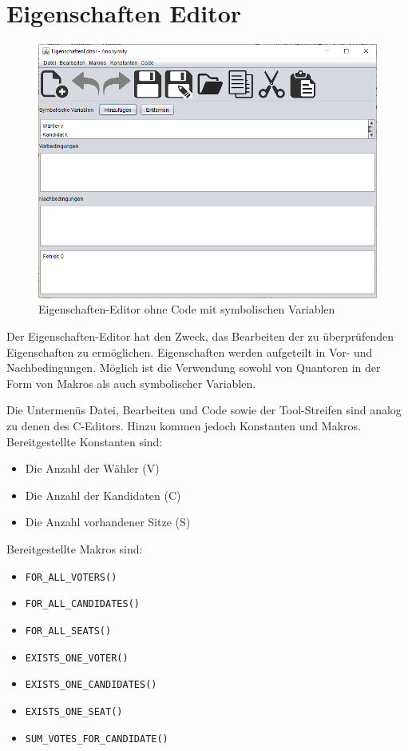 \documentclass[a4paper]{scrreprt}
\begin{document}
\section{Eigenschaften Editor}

\begin{figure}[H]
\includegraphics[scale=0.5]{raw-ohne-code.png}
\caption{Eigenschaften-Editor ohne Code mit symbolischen Variablen}
\label{Eigenschaften-Editor-ohne-code}
\end{figure}

Der Eigenschaften-Editor hat den Zweck, das Bearbeiten der zu überprüfenden Eigenschaften zu ermöglichen. Eigenschaften werden aufgeteilt in Vor- und Nachbedingungen. Möglich ist die Verwendung sowohl von Quantoren in der Form von Makros als auch symbolischer Variablen. 

Die Untermenüs Datei, Bearbeiten und Code sowie der Tool-Streifen sind analog zu denen des C-Editors. Hinzu kommen jedoch Konstanten und Makros. Bereitgestellte Konstanten sind: 

\begin{itemize}
\item Die Anzahl der Wähler (V)
\item Die Anzahl der Kandidaten (C)
\item Die Anzahl vorhandener Sitze (S)
\end{itemize}

Bereitgestellte Makros sind:

\begin{itemize}
\item \verb!FOR_ALL_VOTERS()!
\item \verb!FOR_ALL_CANDIDATES()!
\item \verb!FOR_ALL_SEATS()!
\item \verb!EXISTS_ONE_VOTER()!
\item \verb!EXISTS_ONE_CANDIDATES()!
\item \verb!EXISTS_ONE_SEAT()!
\item \verb!SUM_VOTES_FOR_CANDIDATE()!
\end{itemize}
\end{document}
